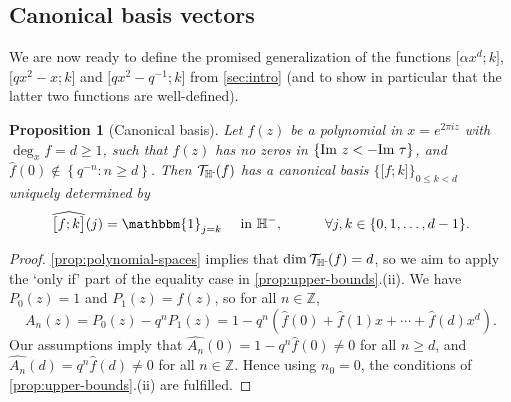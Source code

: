 \documentclass[reqno,11pt]{amsart}
\newtheorem{proposition}[theorem]{Proposition}
\theoremstyle{definition}
\theoremstyle{remark}
\numberwithin{equation}{section}
\newcommand{\Z}{\mathbb{Z}}
\renewcommand{\H}{{\mathbb{H}}}
\newcommand{\Hminus}{{\mathbb{H}^{\textnormal{-}\hspace{-0.03cm}}}}
\newcommand{\mT}{\mathcal{T}}
\newcommand{\one}{\mathbbm{1}}
\renewcommand{\Im}{\textnormal{Im}\ }
\newcommand{\vect}[2]{\big[{#1};{#2}\big]}
\renewcommand{\hat}{\widehat}
\begin{document}
\subsection{Canonical basis vectors} 
\label{subsec:canonical-basis-vectors}
We are now ready to define the promised generalization of the functions $\vect{\alpha x^d}{k}$, $\vect{qx^2-x}{k}$ and $\vect{qx^2-q^{-1}}{k}$ from \cref{sec:intro} (and to show in particular that the latter two functions are well-defined).

\begin{proposition}[Canonical basis]\label{prop:canonical-basis-vectors}
Let $f(z)$ be a polynomial in $x = e^{2\pi i z}$ with $\deg_x f = d \ge 1$, such that $f(z)$ has no zeros in $\{\Im z < -\Im \tau\}$, and $\hat{f}(0) \not\in \left\{q^{-n} : n \ge d \right\}$. Then $\mT_\Hminus(f)$ has a canonical basis $\{\vect{f}{k}\}_{0 \le k < d}$ uniquely determined by
\[
    \hat{\vect{f}{k}}(j) = \one_{j=k} \quad \text{ in } \H^-, \qquad\quad  \forall j, k \in \{0, 1, \ldots, d-1\}.
\] 
\end{proposition}
\begin{proof}
\cref{prop:polynomial-spaces} implies that $\dim \mT_\Hminus(f) = d$, so we aim to apply the `only if' part of the equality case in \cref{prop:upper-bounds}.(ii). We have $P_0(z) = 1$ and $P_1(z) = f(z)$, so for all $n \in \Z$,
\[
    A_n(z) = P_0(z) - q^n P_1(z) 
    =
    1 - q^n \left(\hat{f}(0) + \hat{f}(1)x + \cdots + \hat{f}(d)x^d \right).
\]
Our assumptions imply that $\hat{A_n}(0) = 1 - q^n \hat{f}(0) \neq 0$ for all $n \ge d$, and $\hat{A_n}(d) = q^n \hat{f}(d) \neq 0$ for all $n \in \Z$. Hence using $n_0 = 0$, the conditions of \cref{prop:upper-bounds}.(ii) are fulfilled.
\end{proof}
\end{document}
